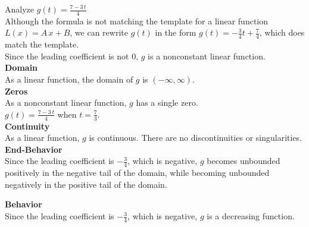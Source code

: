 \documentclass{ximera}
\begin{document}
\begin{example}

Analyze $g(t) = \frac{7 - 3 \, t}{4}$  \\


Although the formula is not matching the template for a linear function $L(x) = A \, x + B$, we can rewrite $g(t)$ in the form $g(t) = -\frac{3}{4} t + \frac{7}{4}$, which does match the template. \\

Since the leading coefficient is not $0$, $g$ is a nonconstant linear function.\\



\textbf{Domain} \\

As a linear function, the domain of $g$ is $(-\infty, \infty)$.\\


\textbf{Zeros} \\

As a nonconstant linear function, $g$ has a single zero.\\

$g(t) = \frac{7 - 3 \, t}{4}$ when $t = \frac{7}{3}$. \\


\textbf{Continuity} \\

As a linear function, $g$ is continuous.  There are no discontinuities or singularities. \\



\textbf{End-Behavior} \\

Since the leading coefficient is $-\frac{3}{4}$, which is negative, $g$ becomes unbounded positively in the negative tail of the domain, while becoming unbounded negatively in the positive tail of the domain.




\textbf{Behavior} \\

Since the leading coefficient is $-\frac{3}{4}$, which is negative, $g$ is a decreasing function. \\




\end{example}
\end{document}
